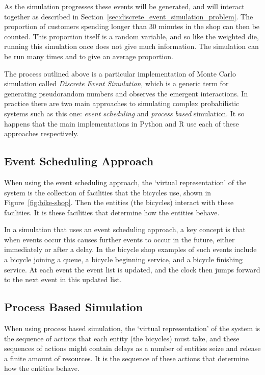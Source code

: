 As the simulation progresses these events will be generated, and will interact
together as described in Section~\ref{sec:discrete_event_simulation_problem}.
The proportion of customers spending longer than 30 minutes in the shop can then
be counted. This proportion itself is a random variable, and so like the
weighted die, running this simulation once does not give much information.
The simulation can be run many times and to give an average proportion.

The process outlined above is a particular implementation of Monte Carlo
simulation called \textit{Discrete Event Simulation}, which is a generic term
for generating pseudorandom numbers and observes the emergent interactions. In
practice there are two main approaches to simulating complex probabilistic
systems such as this one: \textit{event scheduling} and
\textit{process based} simulation.  It so happens that the main
implementations in Python and R use each of these approaches respectively.

\subsection{Event Scheduling Approach}

When using the event scheduling approach, the `virtual representation' of the
system is the collection of facilities that the bicycles use, shown in
Figure~\ref{fig:bike-shop}. Then the entities (the bicycles) interact with these
facilities. It is these facilities that determine how the entities behave.

In a simulation that uses an event scheduling approach, a key concept is that
when events occur this causes further events to occur in the future, either
immediately or after a delay.
In the bicycle shop examples of such events include a bicycle joining a queue, a
bicycle beginning service, and a bicycle finishing service. At each event the
event list is updated, and the clock then jumps forward to the next event in
this updated list.

\subsection{Process Based Simulation}

When using process based simulation, the `virtual
representation' of the system is the sequence of actions that each entity
(the bicycles) must take, and these sequences of actions might contain delays as
a number of entities seize and release a finite amount of resources. It is the
sequence of these actions that determine how the entities behave.

